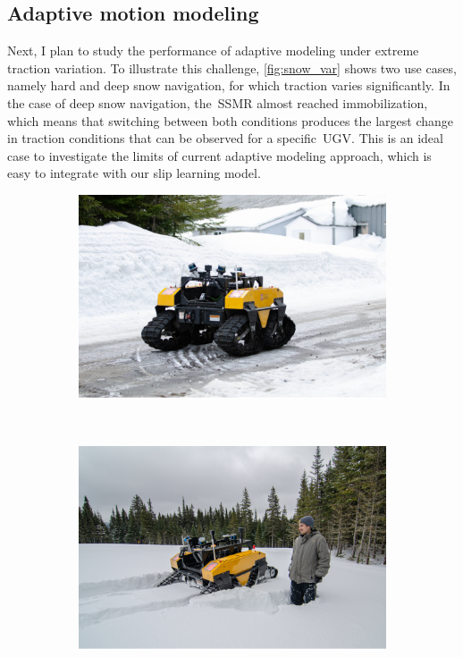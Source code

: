 \documentclass[12pt,letterpaper,oneside]{article}
\begin{document}
\subsection{Adaptive motion modeling}
Next, I plan to study the performance of adaptive modeling under extreme traction variation.
To illustrate this challenge, \autoref{fig:snow_var} shows two use cases, namely hard and deep snow navigation, for which traction varies significantly.
In the case of deep snow navigation, the~\ac{SSMR} almost reached immobilization, which means that switching between both conditions produces the largest change in traction conditions that can be observed for a specific~\ac{UGV}.
This is an ideal case to investigate the limits of current adaptive modeling approach, which is easy to integrate with our slip learning model. %
\begin{figure}[h!]
	\begin{center}
		\begin{subfigure}[b]{0.49\textwidth}
			\includegraphics[width=\linewidth]{figs/warthog_hard_snow.pdf}
			\caption{}
			\label{fig:hard_snow}
		\end{subfigure}%
		~
		\begin{subfigure}[b]{0.49\textwidth}
			\includegraphics[width=\linewidth]{figs/snow_depth.pdf}

\end{subfigure}
\end{center}
\end{figure}
\end{document}
